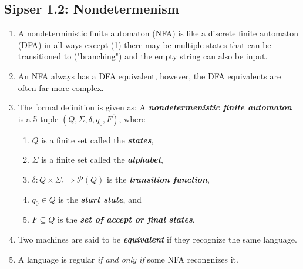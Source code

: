 \documentclass{article}
\begin{document}
\subsection{Sipser 1.2: Nondetermenism}
\begin{enumerate}
    \item A nondeterministic finite automaton (NFA) is like a discrete finite automaton (DFA) in all ways except (1) there may be multiple states that can be transitioned to ("branching") and the empty string can also be input.
    \item An NFA always has a DFA equivalent, however, the DFA equivalents are often far more complex.
    \item The formal definition is given as: A \textbf{\textit{ nondetermenistic finite automaton}} is a 5-tuple $(Q,\Sigma,\delta,q_0,F)$, where 
    \begin{enumerate}
        \item $Q$ is a finite set called the \textbf{\textit{states}},
        \item $\Sigma$ is a finite set called the \textbf{\textit{alphabet}},
        \item $\delta: Q \times \Sigma_\epsilon \Rightarrow \mathcal{P}(Q)$ is the \textbf{\textit{transition function}},
        \item $q_0 \in Q$ is the \textbf{\textit{start state}}, and
        \item $F \subseteq Q$ is the \textbf{\textit{set of accept or final states}}.
    \end{enumerate}
    \item Two machines are said to be \textbf{\textit{equivalent}} if they recognize the same language.
    \item A language is regular \textit{if and only if} some NFA recongnizes it.
\end{enumerate}
\end{document}
